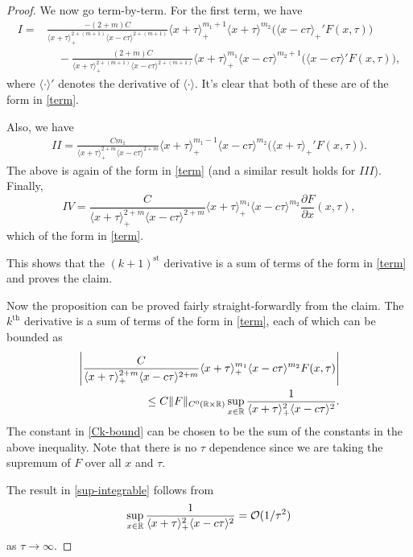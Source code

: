 \begin{proof}
	We now go term-by-term. For the first term, we have
	\begin{align*}
		I =& \frac {-(2+m)C} {\langle x +\tau\rangle_+^{2+(m+1)} \langle x -c\tau \rangle^{2+(m+1)}}\langle x + \tau \rangle_+^{m_1+1}\langle x+\tau\rangle^{m_2} \Big(\langle x-c\tau\rangle_+'F(x,\tau)\Big) \\
		&\quad-\frac {(2+m)C} {\langle x +\tau\rangle_+^{2+(m+1)} \langle x -c\tau \rangle^{2+(m+1)}}\langle x + \tau \rangle_+^{m_1}\langle x-c\tau\rangle^{m_2+1} \Big(\langle x-c\tau\rangle'F(x,\tau)\Big),
	\end{align*}
	where \(\langle \cdot \rangle'\) denotes the derivative of \(\langle \cdot \rangle\). It's clear that both of these are of the form in \cref{term}.
	
	Also, we have 
	\begin{align*}
		II = \frac {Cm_1} {\langle x +\tau\rangle_+^{2+m} \langle x -c\tau \rangle^{2+m}}\langle x + \tau \rangle_+^{m_1-1}\langle x-c\tau\rangle^{m_2} \Big( \langle x+\tau\rangle_+'F(x,\tau)\Big).
	\end{align*}
	The above is again of the form in \cref{term} (and a similar result holds for \(III\)). Finally,
	\begin{equation}
		IV = \frac C {\langle x +\tau\rangle_+^{2+m} \langle x -c\tau \rangle^{2+m}}\langle x + \tau \rangle_+^{m_1}\langle x-c\tau\rangle^{m_2} \frac{\partial F}{\partial x}(x,\tau),
	\end{equation}
	which of the form in \cref{term}.
	
	This shows that the \((k+1)^\text{st}\) derivative is a sum of terms of the form in \cref{term} and proves the claim.
	
	Now the proposition can be proved fairly straight-forwardly from the claim. The \(k^\text{th}\) derivative is a sum of terms of the form in \cref{term}, each of which can be bounded as
	\begin{align*}
		\left|\frac C {\langle x +\tau\rangle_+^{2+m} \langle x -c\tau \rangle^{2+m}}\langle x + \tau \rangle_+^{m_1}\langle x-c\tau\rangle^{m_2} F(x,\tau)\right| \\
		\leq C \| F \|_{C^0(\mathbb{R}\times \mathbb{R})} \sup_{x\in\mathbb R} \frac 1 {\langle x+\tau\rangle_+^2 \langle x -c\tau \rangle^2}.
	\end{align*}
	The constant in \cref{Ck-bound} can be chosen to be the sum of the constants in the above inequality. Note that there is no \(\tau\) dependence since we are taking the supremum of \(F\) over all \(x\) and \(\tau\).
	
	The result in \cref{sup-integrable} follows from 
	\begin{equation}
		\sup_{x\in\mathbb{R}} \frac 1 {\langle x+\tau\rangle_+^2 \langle x -c\tau \rangle^2} = \mathcal O (1/\tau^2)
	\end{equation}
	as \(\tau\to \infty\).
\end{proof}


